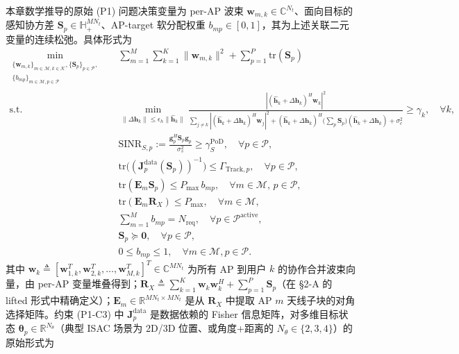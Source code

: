 \documentclass[12pt,a4paper]{article}
\newcommand{\vect}[1]{\mathbf{#1}}
\newcommand{\mat}[1]{\mathbf{#1}}
\newcommand{\tr}{\text{tr}}
\begin{document}
本章数学推导的原始 (P1) 问题决策变量为 per-AP 波束 $\vect{w}_{m,k} \in \mathbb{C}^{N_t}$、面向目标的感知协方差 $\mat{S}_p\in\mathbb{H}_+^{MN_t}$、AP-target 软分配权重 $b_{mp}\in[0,1]$，其为上述关联二元变量的连续松弛。具体形式为
\begin{align}
\min_{\substack{\{\vect{w}_{m,k}\}_{m \in \mathcal{M}, k \in \mathcal{K}}, \{\mat{S}_p\}_{p \in \mathcal{P}}, \\ \{b_{mp}\}_{m \in \mathcal{M}, p \in \mathcal{P}}}} \quad
& \sum_{m=1}^{M} \sum_{k=1}^{K} \|\vect{w}_{m,k}\|^2 + \sum_{p=1}^{P} \tr(\mat{S}_p) \tag{P1-objective} \\
\text{s.t.} \quad
& \min_{\|\Delta\vect{h}_k\| \leq \epsilon_h \|\hat{\vect{h}}_k\|} \frac{|(\hat{\vect{h}}_k + \Delta\vect{h}_k)^H \vect{w}_k|^2}{\sum_{j \neq k} |(\hat{\vect{h}}_k + \Delta\vect{h}_k)^H \vect{w}_j|^2 + (\hat{\vect{h}}_k + \Delta\vect{h}_k)^H \big(\textstyle\sum_p \mat{S}_p\big) (\hat{\vect{h}}_k + \Delta\vect{h}_k) + \sigma_c^2} \geq \gamma_k, \quad \forall k, \tag{P1-C1} \\
& \text{SINR}_{S,p} := \frac{\vect{g}_p^H \mat{S}_p \vect{g}_p}{\sigma_s^2} \geq \gamma_S^{\text{PoD}}, \quad \forall p \in \mathcal{P}, \tag{P1-C2} \\
& \tr\big((\mat{J}_p^{\text{data}}(\mat{S}_p))^{-1}\big) \leq \Gamma_{\text{Track}, p}, \quad \forall p \in \mathcal{P}, \tag{P1-C3} \\
& \tr(\mat{E}_m \mat{S}_p) \leq P_{\max} \, b_{mp}, \quad \forall m \in \mathcal{M}, \, p \in \mathcal{P}, \tag{P1-C4'a} \label{eq:p1c4a} \\
& \tr(\mat{E}_m \mat{R}_X) \leq P_{\max}, \quad \forall m \in \mathcal{M}, \tag{P1-C4'b} \label{eq:p1c4b} \\
& \sum_{m=1}^{M} b_{mp} = N_{\text{req}}, \quad \forall p \in \mathcal{P}^{\text{active}}, \tag{P1-C5'} \\
& \mat{S}_p \succeq \mat{0}, \quad \forall p \in \mathcal{P}, \tag{P1-C6} \\
& 0 \leq b_{mp} \leq 1, \quad \forall m \in \mathcal{M}, p \in \mathcal{P}. \tag{P1-C7'}
\end{align}
其中 $\vect{w}_k \triangleq [\vect{w}_{1,k}^T, \vect{w}_{2,k}^T, \ldots, \vect{w}_{M,k}^T]^T \in \mathbb{C}^{MN_t}$ 为所有 AP 到用户 $k$ 的协作合并波束向量，由 per-AP 变量堆叠得到；$\mat{R}_X \triangleq \sum_{k=1}^{K} \vect{w}_k \vect{w}_k^H + \sum_{p=1}^{P} \mat{S}_p$（在 §2-A 的 lifted 形式中精确定义）；$\mat{E}_m \in \mathbb{R}^{MN_t \times MN_t}$ 是从 $\mat{R}_X$ 中提取 AP $m$ 天线子块的对角选择矩阵。约束 (P1-C3) 中 $\mat{J}_p^{\text{data}}$ 是数据依赖的 Fisher 信息矩阵，对多维目标状态 $\boldsymbol{\theta}_p \in \mathbb{R}^{N_\theta}$（典型 ISAC 场景为 2D/3D 位置、或角度+距离的 $N_\theta \in \{2, 3, 4\}$）的原始形式为
\end{document}

